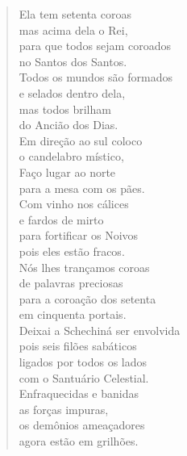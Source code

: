 \begin{verse}
Ela tem setenta coroas\\
mas acima dela o Rei,\\
para que todos sejam coroados\\
no Santos dos Santos.\\[5pt]

Todos os mundos são formados\\
e selados dentro dela,\\
mas todos brilham\\
do Ancião dos Dias.\\[5pt]

Em direção ao sul coloco\\
o candelabro místico,\\
Faço lugar ao norte\\
para a mesa com os pães.\\[5pt]

Com vinho nos cálices\\
e fardos de mirto\\
para fortificar os Noivos\\
pois eles estão fracos.\\[5pt]

Nós lhes trançamos coroas\\
de palavras preciosas\\
para a coroação dos setenta\\
em cinquenta portais.\\[5pt]

Deixai a Schechiná ser envolvida\\
pois seis filões sabáticos\\
ligados por todos os lados\\
com o Santuário Celestial.\\[5pt]

Enfraquecidas e banidas\\
as forças impuras,\\
os demônios ameaçadores\\
agora estão em grilhões.
\end{verse}

